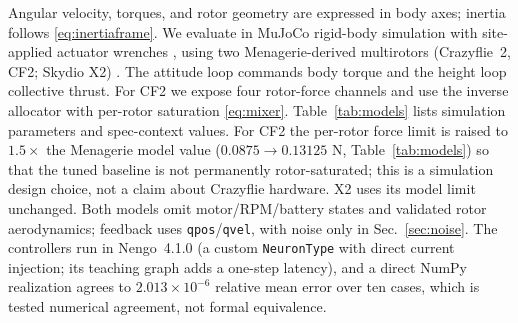 \documentclass[letterpaper, 10 pt, conference]{ieeeconf}
\begin{document}
Angular velocity, torques, and rotor geometry are expressed in body axes; inertia follows \eqref{eq:inertiaframe}.
We evaluate in MuJoCo rigid-body simulation with site-applied actuator wrenches
\cite{todorov2012mujoco}, using two Menagerie-derived multirotors (Crazyflie~2, CF2; Skydio X2)
\cite{menagerieModels}. The attitude loop commands body torque and the height loop
collective thrust. For CF2 we expose four rotor-force channels and use the inverse allocator with per-rotor saturation \eqref{eq:mixer}. Table~\ref{tab:models} lists simulation parameters and
spec-context values. For CF2 the per-rotor force limit is raised to $1.5\times$ the Menagerie model value ($0.0875\to0.13125$ N, Table~\ref{tab:models}) so that the tuned baseline is not permanently rotor-saturated; this is a simulation design choice, not a claim about Crazyflie hardware. X2 uses its model limit unchanged. Both models omit motor/RPM/battery states and validated rotor
aerodynamics; feedback uses \texttt{qpos}/\texttt{qvel}, with noise only in Sec.~\ref{sec:noise}. The controllers run in Nengo~4.1.0 (a custom \texttt{NeuronType} with direct current injection; its teaching graph adds a one-step latency), and a direct NumPy realization agrees to $2.013\times10^{-6}$ relative mean error over ten cases, which is tested numerical agreement, not formal equivalence.
%
\end{document}
